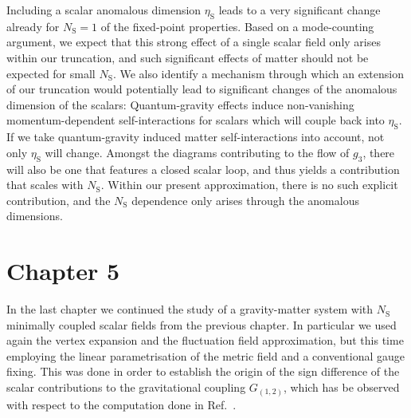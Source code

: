 \documentclass[11pt]{book}
\newcommand\etaS{ \eta_{\scriptscriptstyle{\mathrm{S}}} }
\newcommand\NS{ N_{\scriptscriptstyle{\mathrm{S}}} }
\newcommand\eg{\textit{e.g.}\ }
\numberwithin{equation}{chapter}
\begin{document}
Including a scalar anomalous dimension $\etaS$ leads to a very significant change already for $\NS=1$
of the fixed-point properties.
Based on a mode-counting argument, we expect that this strong effect of a single scalar field
only arises within our truncation,
and such significant effects of matter should not be expected for small $\NS$.
We also identify a mechanism through which an extension of our truncation would potentially
lead to significant changes of the anomalous dimension of the scalars:
Quantum-gravity effects induce non-vanishing momentum-dependent self-interactions
for scalars \cite{Eichhorn:2012va} which will couple back into $\etaS$.
If we take quantum-gravity induced matter self-interactions into account,
not only $\etaS$ will change.
Amongst the diagrams contributing to the flow of $g_3$,
there will also be one that features a closed scalar loop,
and thus yields a contribution that scales with $\NS$.
Within our present approximation, there is no such explicit contribution,
and the $\NS$ dependence only arises through the anomalous dimensions.


\section*{Chapter 5}

In the last chapter we continued the study of a gravity-matter system with
$\NS$ minimally coupled scalar fields from the previous chapter.
In particular we used again the vertex expansion and the fluctuation field approximation,
but this time employing the linear parametrisation of the metric field
and a conventional gauge fixing. This was done in order to establish the origin
of the sign difference of the scalar contributions to the gravitational
coupling $G_{(1,2)}$, which has be observed with respect to the computation
done in Ref.~\cite{Dona:2013qba}.
\end{document}

